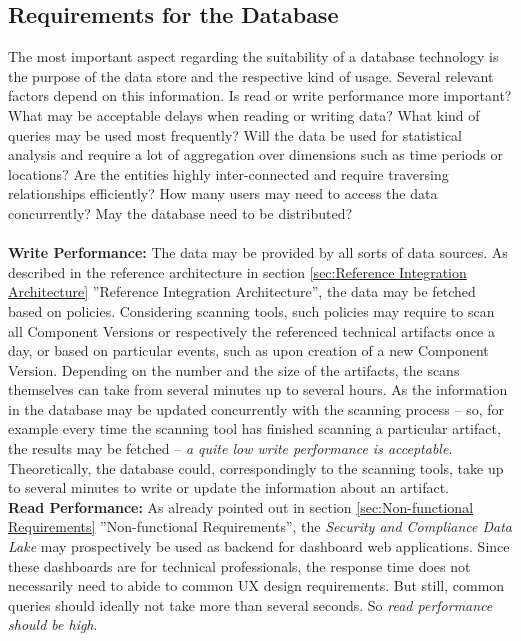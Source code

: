 \subsection{Requirements for the Database}
The most important aspect regarding the suitability of a database technology is the purpose of the data store and the respective kind of usage. Several relevant factors depend on this information. Is read or write performance more important? What may be acceptable delays when reading or writing data? What kind of queries may be used most frequently? Will the data be used for statistical analysis and require a lot of aggregation over dimensions such as time periods or locations? Are the entities highly inter-connected and require traversing relationships efficiently? How many users may need to access the data concurrently? May the database need to be distributed?\\\\
\textbf{Write Performance:} The data may be provided by all sorts of data sources. As described in the reference architecture in section \ref{sec:Reference Integration Architecture} ''Reference Integration Architecture'', the data may be fetched based on policies. Considering scanning tools, such policies may require to scan all Component Versions or respectively the referenced technical artifacts once a day, or based on particular events, such as upon creation of a new Component Version. Depending on the number and the size of the artifacts, the scans themselves can take from several minutes up to several hours. As the information in the database may be updated concurrently with the scanning process -- so, for example every time the scanning tool has finished scanning a particular artifact, the results may be fetched -- \emph{a quite low write performance is acceptable}. Theoretically, the database could, correspondingly to the scanning tools, take up to several minutes to write or update the information about an artifact.\\
\textbf{Read Performance:} As already pointed out in section \ref{sec:Non-functional Requirements} ''Non-functional Requirements'', the \emph{Security and Compliance Data Lake} may prospectively be used as backend for dashboard web applications. Since these dashboards are for technical professionals, the response time does not necessarily need to abide to common UX design requirements. But still, common queries should ideally not take more than several seconds. So \emph{read performance should be high}.\\
